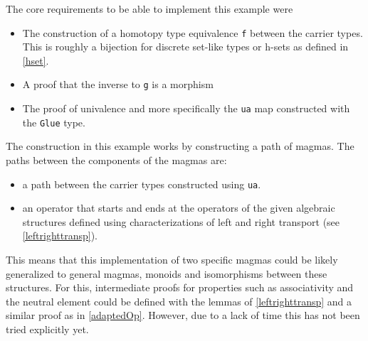 \documentclass[12pt,a4paper,twoside,xetex]{book} %
\begin{document}
The core requirements to be able to implement this example were
\begin{itemize}
 \item The construction of a homotopy type equivalence \texttt{f} between the carrier types. This is roughly a bijection for discrete set-like types or h-sets as defined in \cref{hset}.
 \item A proof that the inverse to \texttt{g} is a morphism
 \item The proof of univalence and more specifically the \texttt{ua} map constructed with the \texttt{Glue} type. 
\end{itemize}

The construction in this example works by constructing a path of magmas. The paths between the components of the magmas are:
\begin{itemize}
\item a path between the carrier types constructed using \texttt{ua}.
\item an operator that starts and ends at the operators of the given algebraic structures defined using characterizations of left and right transport (see \cref{leftrighttransp}).
\end{itemize}

This means that this implementation of two specific magmas could be likely generalized to general magmas, monoids and isomorphisms between these structures. For this, intermediate proofs for properties such as associativity and the neutral element  could be defined  with the lemmas of \cref{leftrighttransp} and a similar proof as in \cref{adaptedOp}. However, due to a lack of time this has not been tried explicitly yet.
\end{document}
